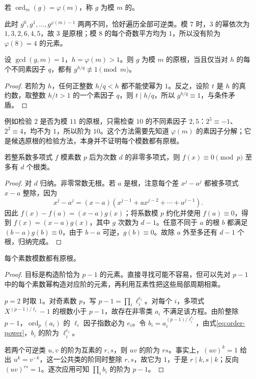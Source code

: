 \documentclass[UTF8,12pt,a4paper,fontset=fandol]{ctexbook}
\begin{document}
\begin{definition}
若 $\operatorname{ord}_m(g)=\varphi(m)$，称 $g$ 为模 $m$ 的。
\end{definition}

此时 $g^0,g^1,\ldots,g^{\varphi(m)-1}$ 两两不同，恰好遍历全部可逆类。模 $7$ 时，$3$ 的幂依次为 $1,3,2,6,4,5$，故 $3$ 是原根；模 $8$ 的每个奇数平方均为 $1$，所以没有阶为 $\varphi(8)=4$ 的元素。

\begin{proposition}[原根的实用检验]
\label{prop:primitive-root-test}
设 $\gcd(g,m)=1$，$h=\varphi(m)>1$。则 $g$ 为模 $m$ 的原根，当且仅当对 $h$ 的每个不同素因子 $q$，都有 $g^{h/q}\not\equiv1\pmod m$。
\end{proposition}
\begin{proof}
若阶为 $h$，任何正整数 $h/q<h$ 都不能使幂为 $1$。反之，设阶 $t$ 是 $h$ 的真约数，取整数 $h/t>1$ 的一个素因子 $q$，则 $t\mid h/q$，所以 $g^{h/q}\equiv1$，与条件矛盾。
\end{proof}

例如检验 $2$ 是否为模 $11$ 的原根，只需检查 $10$ 的不同素因子 $2,5$：$2^5\equiv-1$、$2^2\equiv4$，均不为 $1$，所以阶为 $10$。这个方法需要先知道 $\varphi(m)$ 的素因子分解；它是候选原根的检验方法，本身并不证明每个模数都有原根。

\begin{lemma}[模素数的根数界]
\label{lem:polynomial-roots}
若整系数多项式 $f$ 模素数 $p$ 后为次数 $d$ 的非零多项式，则 $f(x)\equiv0\pmod p$ 至多有 $d$ 个根类。
\end{lemma}
\begin{proof}
对 $d$ 归纳。非零常数无根。若 $a$ 是根，注意每个差 $x^j-a^j$ 都被多项式 $x-a$ 整除，因为
\[
 x^j-a^j=(x-a)(x^{j-1}+ax^{j-2}+\cdots+a^{j-1}).
\]
因此 $f(x)-f(a)=(x-a)g(x)$；将系数模 $p$ 约化并使用 $f(a)\equiv0$，得到 $f(x)=(x-a)g(x)$，其中 $g$ 次数为 $d-1$。任意不同于 $a$ 的根 $b$ 都满足 $(b-a)g(b)\equiv0$，由于 $b-a$ 可逆，$g(b)\equiv0$。故除 $a$ 外至多还有 $d-1$ 个根，归纳完成。
\end{proof}

\begin{theorem}
\label{thm:prime-primitive-root}
每个素数模数都有原根。
\end{theorem}
\begin{proof}
目标是构造阶恰为 $p-1$ 的元素。直接寻找可能不容易，但可以先对 $p-1$ 中的每个素数幂构造对应阶的元素，再利用互素性把这些局部周期相乘。

$p=2$ 时取 $1$。对奇素数 $p$，写 $p-1=\prod_i\ell_i^{e_i}$。对每个 $i$，多项式 $X^{(p-1)/\ell_i}-1$ 的根数小于 $p-1$，故存在非零类 $a_i$ 不满足该方程。由阶整除 $p-1$，$\operatorname{ord}_p(a_i)$ 的 $\ell_i$ 因子指数必为 $e_i$。令 $b_i=a_i^{(p-1)/\ell_i^{e_i}}$，由式\eqref{eq:order-power}，$b_i$ 的阶为 $\ell_i^{e_i}$。

若两个可逆类 $u,v$ 的阶为互素的 $r,s$，则 $uv$ 的阶为 $rs$。事实上，$(uv)^k=1$ 给出 $u^k=v^{-k}$，这一公共类的阶同时整除 $r,s$，故它为 $1$，于是 $r\mid k,s\mid k$；反向 $(uv)^{rs}=1$。逐次应用可知 $\prod_i b_i$ 的阶为 $p-1$。
\end{proof}
\end{document}
